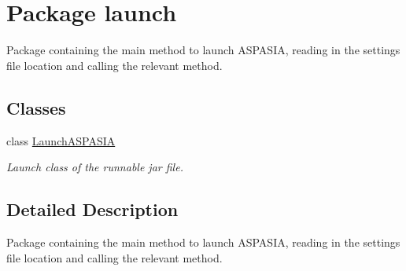 \hypertarget{namespacelaunch}{}\section{Package launch}
\label{namespacelaunch}


Package containing the main method to launch A\+S\+P\+A\+S\+I\+A, reading in the settings file location and calling the relevant method.  


\subsection*{Classes}
\begin{DoxyCompactItemize}
\item 
class \hyperlink{classlaunch_1_1LaunchASPASIA}{Launch\+A\+S\+P\+A\+S\+I\+A}
\begin{DoxyCompactList}\small\item\em Launch class of the runnable jar file. \end{DoxyCompactList}\end{DoxyCompactItemize}


\subsection{Detailed Description}
Package containing the main method to launch A\+S\+P\+A\+S\+I\+A, reading in the settings file location and calling the relevant method. 
